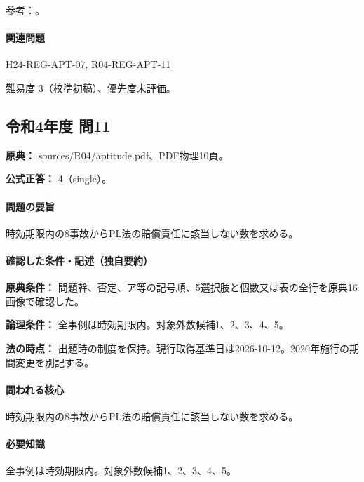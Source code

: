 \par 参考：\cite{pl_statute,pl_qa,pl_definitions2018}。

\paragraph{関連問題} \hyperref[q:h24-reg-apt-07]{H24-REG-APT-07}, \hyperref[q:r04-reg-apt-11]{R04-REG-APT-11}

\par 難易度 3（校準初稿）、優先度未評価。

\subsection{令和4年度 問11}
\label{q:r04-reg-apt-11}

\noindent\textbf{原典：} sources/R04/aptitude.pdf、PDF物理10頁。

\textbf{公式正答：} 4（single）。

\paragraph{問題の要旨} 時効期限内の8事故からPL法の賠償責任に該当しない数を求める。

\paragraph{確認した条件・記述（独自要約）}\mbox{}\par

\noindent\textbf{原典条件：} 問題幹、否定、ア等の記号順、5選択肢と個数又は表の全行を原典16画像で確認した。\par

\noindent\textbf{論理条件：} 全事例は時効期限内。対象外数候補1、2、3、4、5。\par

\noindent\textbf{法の時点：} 出題時の制度を保持。現行取得基準日は2026-10-12。2020年施行の期間変更を別記する。\par

\paragraph{問われる核心} 時効期限内の8事故からPL法の賠償責任に該当しない数を求める。

\paragraph{必要知識} 全事例は時効期限内。対象外数候補1、2、3、4、5。

